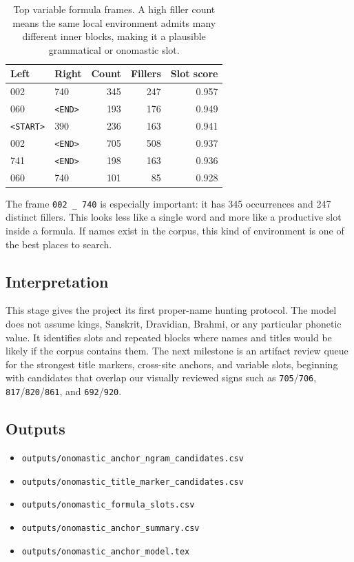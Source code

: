 \begin{table}[htbp]
\centering
\begin{tabular}{llrrr}
\toprule
\textbf{Left} & \textbf{Right} & \textbf{Count} & \textbf{Fillers} & \textbf{Slot score} \\
\midrule
002 & 740 & 345 & 247 & 0.957 \\
060 & \texttt{<END>} & 193 & 176 & 0.949 \\
\texttt{<START>} & 390 & 236 & 163 & 0.941 \\
002 & \texttt{<END>} & 705 & 508 & 0.937 \\
741 & \texttt{<END>} & 198 & 163 & 0.936 \\
060 & 740 & 101 & 85 & 0.928 \\
\bottomrule
\end{tabular}
\caption{Top variable formula frames. A high filler count means the same local environment admits many different inner blocks, making it a plausible grammatical or onomastic slot.}
\label{tab:variable-formula-slots}
\end{table}

The frame \texttt{002 \_ 740} is especially important: it has 345 occurrences and 247 distinct fillers. This looks less like a single word and more like a productive slot inside a formula. If names exist in the corpus, this kind of environment is one of the best places to search.

\subsection{Interpretation}

This stage gives the project its first proper-name hunting protocol. The model does not assume kings, Sanskrit, Dravidian, Brahmi, or any particular phonetic value. It identifies slots and repeated blocks where names and titles would be likely if the corpus contains them. The next milestone is an artifact review queue for the strongest title markers, cross-site anchors, and variable slots, beginning with candidates that overlap our visually reviewed signs such as \texttt{705}/\texttt{706}, \texttt{817}/\texttt{820}/\texttt{861}, and \texttt{692}/\texttt{920}.

\subsection{Outputs}

\begin{itemize}
  \item \texttt{outputs/onomastic\_anchor\_ngram\_candidates.csv}
  \item \texttt{outputs/onomastic\_title\_marker\_candidates.csv}
  \item \texttt{outputs/onomastic\_formula\_slots.csv}
  \item \texttt{outputs/onomastic\_anchor\_summary.csv}
  \item \texttt{outputs/onomastic\_anchor\_model.tex}
\end{itemize}
